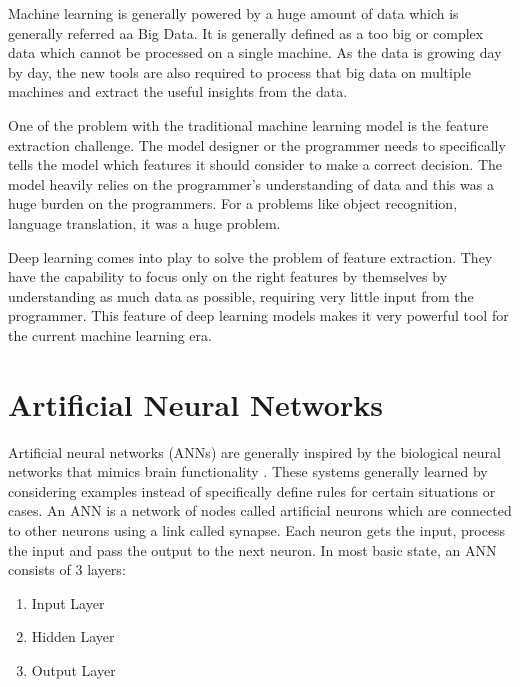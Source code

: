 Machine learning is generally powered by a huge amount of data which is generally referred aa Big Data. It is generally defined as a too big or complex data which cannot be processed on a single machine. As the data is growing day by day, the new tools are also required to process that big data on multiple machines and extract the useful insights from the data.


One of the problem with the traditional machine learning model is the feature extraction challenge. The model designer or the programmer needs to specifically tells the model which features it should consider to make a correct decision. The model heavily relies on the programmer's understanding of data and this was a huge burden on the programmers. For a problems like object recognition, language translation, it was a huge problem.

Deep learning comes into play to solve the problem of feature extraction. They have the capability to focus only on the right features by themselves by understanding as much data as possible, requiring very little input from the programmer. This feature of deep learning models makes it very powerful tool for the current machine learning era.




\section{Artificial Neural Networks}
Artificial neural networks (ANNs) are generally inspired by the biological neural networks that mimics brain functionality \cite{wiki:ann}. These systems generally learned by considering examples instead of specifically define rules for certain situations or cases. An ANN is a network of nodes called artificial neurons which are connected to other neurons using a link called synapse. Each neuron gets the input, process the input and pass the output to the next neuron.
In most basic state, an ANN consists of 3 layers:

\begin{enumerate}
	\item Input Layer
	\item Hidden Layer
	\item Output Layer
\end{enumerate}

